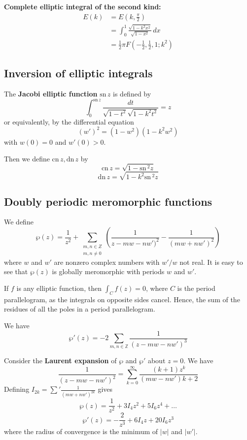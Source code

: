 \documentclass[10pt, oneside, reqno]{amsart}
\theoremstyle{plain}%
\theoremstyle{definition}
\theoremstyle{remark}
\newcommand{\Z}{\mathbb{Z}}
\begin{document}
\textbf{Complete elliptic integral of the second kind:}\begin{align*}
    E(k) &= E(k, \frac{\pi}{2}) \\
            &= \int_0^1 \frac{\sqrt{1-k^2x^2}}{\sqrt{1-x^2}} \, dx \\
            &= \frac{1}{2} \pi F(-\frac{1}{2}, \frac{1}{2}, 1; k^2)
\end{align*}


\subsection{Inversion of elliptic integrals} %

\newcommand{\sn}{\text{sn}\,}
\newcommand{\cn}{\text{cn}\,}
\newcommand{\dn}{\text{dn}\,}

\label{sub:inversion_of_ellitpic_integrals}
The \textbf{Jacobi elliptic function} $\sn z$ is defined by \[
    \int_0^{\sn z} \frac{dt}{\sqrt{1 - t^2}\sqrt{1 - k^2 t^2}} = z
\] or equivalently, by the differential equation \[
    (w')^2 = (1-w^2)(1 - k^2 w^2) 
\] with $w(0) = 0$ and $w'(0) > 0$.

Then we define $\cn z, \dn z$ by \[
    \cn z = \sqrt{1 - \sn^2 z}
\]\[
    \dn z = \sqrt{1 - k^2 \sn^2 z}
\]

\subsection{Doubly periodic meromorphic functions} %
\label{sub:doubly_periodic_meromorphic_functions}
 We define \[
    \wp(z) = \frac{1}{z^2} + \sum_{\substack{m,n \in Z \\ m,n \neq 0}} \left( \frac{1}{z - mw - nw')^2} - \frac{1}{(mw + nw')^2} \right)
 \] where $w$ and $w'$ are nonzero complex numbers with $w'/w$ not real.  It is easy to see that $\wp(z)$ is globally meromorphic with periods $w$ and $w'$.  

If $f$ is any elliptic function, then $\int_C f(z) = 0$, where $C$ is the period parallelogram, as the integrals on opposite sides cancel.  Hence, the sum of the residues of all the poles in a period parallelogram.

We have \[
    \wp'(z) = -2 \sum_{m,n \in \Z} \frac{1}{(z - mw - nw')^3}
\]

Consider the \textbf{Laurent expansion} of $\wp$ and $\wp'$ about $z = 0$.  We have \[
    \frac{1}{(z - mw - nw')^2} = \sum_{k = 0}^\infty \frac{(k+1)z^k}{(mw - nw'){k+2}}
\]
Defining $I_{2k} = \sum' \frac{1}{(mw + nw')^{2k}}$ gives \[
    \wp(z) = \frac{1}{z^2} + 3I_4 z^2 + 5 I_6 z^4 + \dots
\]
\[
    \wp'(z) = -\frac{2}{z^3} + 6I_4 z + 20 I_6 z^3
\] where the radius of convergence is the minimum of $|w|$ and $|w'|$.
\end{document}
